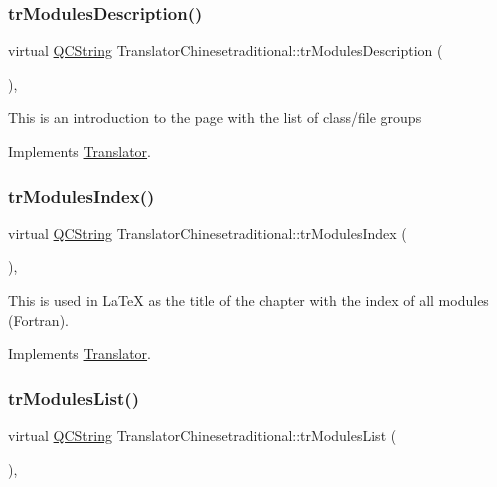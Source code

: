 \subsubsection{\texorpdfstring{trModulesDescription()}{trModulesDescription()}}
{\footnotesize\ttfamily virtual \mbox{\hyperlink{class_q_c_string}{Q\+C\+String}} Translator\+Chinesetraditional\+::tr\+Modules\+Description (\begin{DoxyParamCaption}{ }\end{DoxyParamCaption})\hspace{0.3cm}{\ttfamily [inline]}, {\ttfamily [virtual]}}

This is an introduction to the page with the list of class/file groups 

Implements \mbox{\hyperlink{class_translator}{Translator}}.

\mbox{\label{class_translator_chinesetraditional_a31b911b3155793f6c936e4641d6c0861}} 
\subsubsection{\texorpdfstring{trModulesIndex()}{trModulesIndex()}}
{\footnotesize\ttfamily virtual \mbox{\hyperlink{class_q_c_string}{Q\+C\+String}} Translator\+Chinesetraditional\+::tr\+Modules\+Index (\begin{DoxyParamCaption}{ }\end{DoxyParamCaption})\hspace{0.3cm}{\ttfamily [inline]}, {\ttfamily [virtual]}}

This is used in La\+TeX as the title of the chapter with the index of all modules (Fortran). 

Implements \mbox{\hyperlink{class_translator}{Translator}}.

\mbox{\label{class_translator_chinesetraditional_a0ea6d46cf9909297807b95398e087dfb}} 
\subsubsection{\texorpdfstring{trModulesList()}{trModulesList()}}
{\footnotesize\ttfamily virtual \mbox{\hyperlink{class_q_c_string}{Q\+C\+String}} Translator\+Chinesetraditional\+::tr\+Modules\+List (\begin{DoxyParamCaption}{ }\end{DoxyParamCaption})\hspace{0.3cm}{\ttfamily [inline]}, {\ttfamily [virtual]}}

